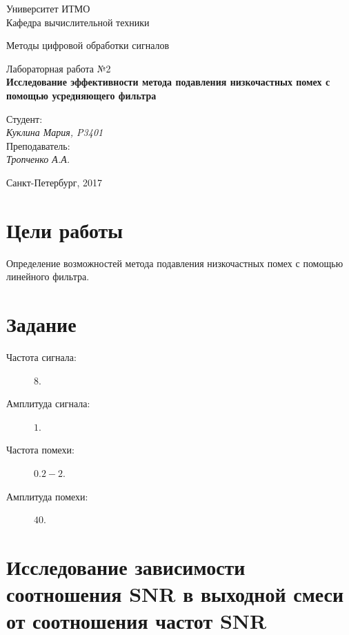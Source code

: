 \documentclass[12pt, a4paper] {ncc}
\begin{document}
\setcounter{figure}{0}
\frenchspacing
\pagestyle{empty}
\begin{center}
							Университет ИТМО	\\
                        Кафедра вычислительной техники

                    Методы цифровой обработки сигналов
\end{center}
\begin{center}
                            Лабораторная работа №2\\
						{\bf Исследование эффективности метода подавления низкочастных помех
							 с помощью усредняющего фильтра}
\end{center}
\begin{flushright}
                                    Студент:\\
                                    {\it Куклина Мария, P3401}\\
									Преподаватель: \\
									{\it Тропченко А.А.}
\end{flushright}
\begin{center}
                             Санкт-Петербург, 2017
\end{center}
\newpage


\section{Цели работы}
    Определение возможностей метода подавления низкочастных помех с помощью
	линейного фильтра.

\section{Задание}

    \begin{description}
        \item[Частота сигнала:] $8$.
        \item[Амплитуда сигнала:] $1$.
        \item[Частота помехи:]  $0.2-2$.
        \item[Амплитуда помехи:] $40$.
    \end{description}


\section{Исследование зависимости соотношения SNR в выходной смеси от соотношения частот SNR}
    
\end{document}
